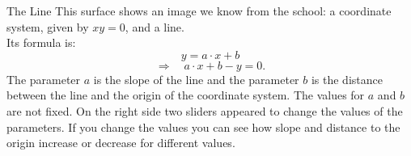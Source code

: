 \begin{surferPage}[Line]{The Line}
This surface shows an image we know from the school: a coordinate system, given by  $xy=0$, and a line. \\Its formula is:
\[y=a\cdot x + b\]
\[ \Rightarrow \quad a\cdot x +b -y=0.\]
The parameter $a$ is the slope of the line and the parameter $b$ is the distance between the line and the origin of the coordinate system.
\newline \newline
The values for $a$ and $b$ are not fixed. On the right side two sliders appeared to change the values of the parameters. If you change the values you can see how slope and distance to the origin increase or decrease for different values.
\end{surferPage}

